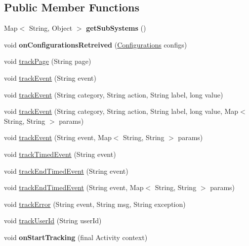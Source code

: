 \subsection*{Public Member Functions}
\begin{DoxyCompactItemize}
\item 
\hypertarget{classcom_1_1spilgames_1_1framework_1_1_spil_a51d42c8109798566650bb0732177e90e}{Map$<$ String, Object $>$ {\bfseries get\-Sub\-Systems} ()}\label{classcom_1_1spilgames_1_1framework_1_1_spil_a51d42c8109798566650bb0732177e90e}

\item 
\hypertarget{classcom_1_1spilgames_1_1framework_1_1_spil_ab7ecdb3ca20a1a78c1819819ae356b84}{void {\bfseries on\-Configurations\-Retreived} (\hyperlink{classcom_1_1spilgames_1_1framework_1_1data_1_1_configurations}{Configurations} configs)}\label{classcom_1_1spilgames_1_1framework_1_1_spil_ab7ecdb3ca20a1a78c1819819ae356b84}

\item 
void \hyperlink{classcom_1_1spilgames_1_1framework_1_1_spil_a0f1c56766325ea664b22af3d8606c543}{track\-Page} (String page)
\item 
void \hyperlink{classcom_1_1spilgames_1_1framework_1_1_spil_a5387c3cdb8fa098aeb69e02f9334632d}{track\-Event} (String event)
\item 
void \hyperlink{classcom_1_1spilgames_1_1framework_1_1_spil_a56a697ac33039ee3d070dc401b911329}{track\-Event} (String category, String action, String label, long value)
\item 
void \hyperlink{classcom_1_1spilgames_1_1framework_1_1_spil_a79422f463a5ca054f03b43bee7bd439c}{track\-Event} (String category, String action, String label, long value, Map$<$ String, String $>$ params)
\item 
void \hyperlink{classcom_1_1spilgames_1_1framework_1_1_spil_ab8f46a94a7b287ddd05e0d5621571eae}{track\-Event} (String event, Map$<$ String, String $>$ params)
\item 
void \hyperlink{classcom_1_1spilgames_1_1framework_1_1_spil_a4531373535e8a2a6b6005f9dddebd36d}{track\-Timed\-Event} (String event)
\item 
void \hyperlink{classcom_1_1spilgames_1_1framework_1_1_spil_a27a023e70b700df1ccf0d25406e54528}{track\-End\-Timed\-Event} (String event)
\item 
void \hyperlink{classcom_1_1spilgames_1_1framework_1_1_spil_a38adb067d964e3d547803e3ed5dbd12f}{track\-End\-Timed\-Event} (String event, Map$<$ String, String $>$ params)
\item 
void \hyperlink{classcom_1_1spilgames_1_1framework_1_1_spil_a72d16f8d326d87efab2de84d1e988283}{track\-Error} (String event, String msg, String exception)
\item 
void \hyperlink{classcom_1_1spilgames_1_1framework_1_1_spil_a1893d2586f46201e3de50a28b2eebe10}{track\-User\-Id} (String user\-Id)
\item 
\hypertarget{classcom_1_1spilgames_1_1framework_1_1_spil_aa5ecbf15cedd76f429063239d585c116}{void {\bfseries on\-Start\-Tracking} (final Activity context)}\label{classcom_1_1spilgames_1_1framework_1_1_spil_aa5ecbf15cedd76f429063239d585c116}


\end{DoxyCompactItemize}
